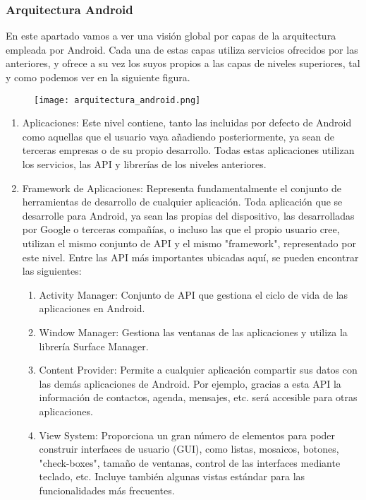 	\subsubsection{Arquitectura Android}
En este apartado vamos a ver una visión global por capas de la arquitectura empleada por Android. Cada una de estas capas utiliza servicios ofrecidos por las anteriores, y ofrece a su vez los suyos propios a las capas de niveles superiores, tal y como podemos ver en la siguiente figura.
\begin{figure}[h]
\texttt{[image: arquitectura\_android.png]} 
\end{figure}


\begin{enumerate}
\item	Aplicaciones: Este nivel contiene, tanto las incluidas por defecto de Android como aquellas que el usuario vaya añadiendo posteriormente, ya sean de terceras empresas o de su propio desarrollo. Todas estas aplicaciones utilizan los servicios, las API y librerías de los niveles anteriores. 
\item	Framework de Aplicaciones: Representa fundamentalmente el conjunto de herramientas de desarrollo de cualquier aplicación. Toda aplicación que se desarrolle para Android, ya sean las propias del dispositivo, las desarrolladas por Google o terceras compañías, o incluso las que el propio usuario cree, utilizan el mismo conjunto de API y el mismo "framework", representado por este nivel. 
Entre las API más importantes ubicadas aquí, se pueden encontrar las siguientes:
\begin{enumerate}
\item	Activity Manager: Conjunto de API que gestiona el ciclo de vida de las aplicaciones en Android.
\item	Window Manager: Gestiona las ventanas de las aplicaciones y utiliza la librería Surface Manager.
\item	Content Provider: Permite a cualquier aplicación compartir sus datos con las demás aplicaciones de Android. Por ejemplo, gracias a esta API la información de contactos, agenda, mensajes, etc. será accesible para otras aplicaciones.
\item	View System: Proporciona un gran número de elementos para poder construir interfaces de usuario (GUI), como listas, mosaicos, botones, "check-boxes", tamaño de ventanas, control de las interfaces mediante teclado, etc. Incluye también algunas vistas estándar para las funcionalidades más frecuentes.

\end{enumerate}
\end{enumerate}
